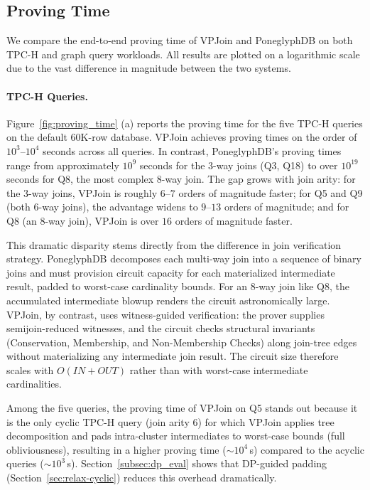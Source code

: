 \documentclass[sigconf]{acmart}
\begin{document}
\subsection{Proving Time}
\label{subsec:proving_time}

We compare the end-to-end proving time of VPJoin and PoneglyphDB on both TPC-H and graph query workloads. All results are plotted on a logarithmic scale due to the vast difference in magnitude between the two systems.

\paragraph{TPC-H Queries.}
Figure~\ref{fig:proving_time} (a) reports the proving time for the five TPC-H queries on the default 60K-row database. VPJoin achieves proving times on the order of $10^3$--$10^4$ seconds across all queries. In contrast, PoneglyphDB's proving times range from approximately $10^{9}$ seconds for the $3$-way joins (Q3, Q18) to over $10^{19}$ seconds for Q8, the most complex $8$-way join. The gap grows with join arity: for the $3$-way joins, VPJoin is roughly $6$--$7$ orders of magnitude faster; for Q5 and Q9 (both $6$-way joins), the advantage widens to $9$--$13$ orders of magnitude; and for Q8 (an $8$-way join), VPJoin is over $16$ orders of magnitude faster.

This dramatic disparity stems directly from the difference in join verification strategy. PoneglyphDB decomposes each multi-way join into a sequence of binary joins and must provision circuit capacity for each materialized intermediate result, padded to worst-case cardinality bounds. For an $8$-way join like Q8, the accumulated intermediate blowup renders the circuit astronomically large. VPJoin, by contrast, uses witness-guided verification: the prover supplies semijoin-reduced witnesses, and the circuit checks structural invariants (Conservation, Membership, and Non-Membership Checks) along join-tree edges without materializing any intermediate join result. The circuit size therefore scales with $O(\mathit{IN} + \mathit{OUT})$ rather than with worst-case intermediate cardinalities.

Among the five queries, the proving time of VPJoin on Q5 stands out because it is the only cyclic TPC-H query (join arity $6$) for which VPJoin applies tree decomposition and pads intra-cluster intermediates to worst-case bounds (full obliviousness), resulting in a higher proving time ($\sim\!10^4$\,s) compared to the acyclic queries ($\sim\!10^3$\,s). Section~\ref{subsec:dp_eval} shows that DP-guided padding (Section~\ref{sec:relax-cyclic}) reduces this overhead dramatically.
\end{document}
